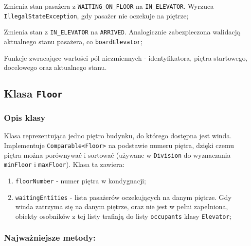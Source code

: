 \documentclass[12pt, a4paper]{article}
\begin{document}
\begin{description}[leftmargin=1cm, style=nextline]
  \item[\texttt{boardElevator()}]
    Zmienia stan pasażera z \texttt{WAITING\_ON\_FLOOR} na \texttt{IN\_ELEVATOR}. Wyrzuca \\ \texttt{IllegalStateException}, gdy pasażer nie oczekuje na piętrze;

  \item[\texttt{exitElevator()}]
    Zmienia stan z \texttt{IN\_ELEVATOR} na \texttt{ARRIVED}. Analogicznie zabezpieczona walidacją aktualnego stanu pasażera, co \texttt{boardElevator};

  \item[\texttt{getId()}, \texttt{getOriginFloor()}, \texttt{getDestinationFloor()}, \texttt{getState()}]
    Funkcje zwracające wartości pól niezmiennych - identyfikatora, piętra startowego, docelowego oraz aktualnego stanu.
\end{description}






\subsection{Klasa \texttt{Floor}}
\label{subsec:floor}

\subsubsection{Opis klasy}

Klasa reprezentująca jedno piętro budynku, do którego dostępna jest winda. Implementuje \texttt{Comparable<Floor>} na podstawie numeru piętra,
dzięki czemu piętra można porównywać i sortować (używane w \texttt{Division} do wyznaczania \texttt{minFloor} i \texttt{maxFloor}). Klasa ta zawiera:
\begin{enumerate}
    \item \texttt{floorNumber} - numer piętra w kondygnacji;
    \item \texttt{waitingEntities} - lista pasażerów oczekujących na danym piętrze. Gdy winda zatrzyma się na danym piętrze, oraz nie jest w pełni zapełniona, 
                obiekty osobników z tej listy trafiają do listy \texttt{occupants} klasy \texttt{Elevator};
\end{enumerate}

\subsubsection{Najważniejsze metody:}
\end{document}
